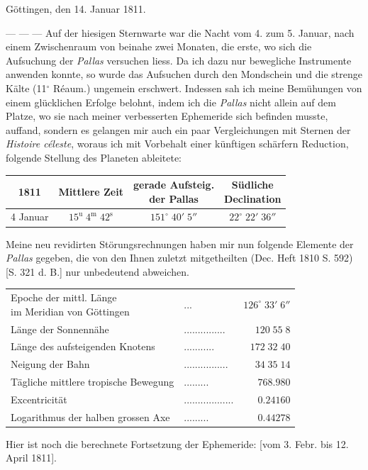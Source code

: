 \begin{flushright}Göttingen, den 14. Januar 1811.\end{flushright}
\par\indent --- --- --- Auf der hiesigen Sternwarte war die Nacht vom 4. zum 5. Januar, nach einem Zwischenraum von beinahe zwei Monaten, die erste, wo sich die Aufsuchung der \emph{Pallas} versuchen liess. Da ich dazu nur bewegliche Instrumente anwenden konnte, so wurde das Aufsuchen durch den Mondschein und die strenge Kälte (11$^\circ$ Réaum.) ungemein erschwert. Indessen sah ich meine Bemühungen von einem glücklichen Erfolge belohnt, indem ich die \emph{Pallas} nicht allein auf dem Platze, wo sie nach meiner verbesserten Ephemeride sich befinden musste, auffand, sondern es gelangen mir auch ein paar Vergleichungen mit Sternen der \emph{Histoire céleste}, woraus ich mit Vorbehalt einer künftigen schärfern Reduction, folgende Stellung des Planeten ableitete:

\begin{center}\fontsize{10}{12}\selectfont\setlength{\tabcolsep}{4pt}\renewcommand{\arraystretch}{1.15}\begin{tabular}{c|c|c|c}
1811 & Mittlere Zeit & \shortstack{gerade Aufsteig.\\der Pallas} & \shortstack{Südliche\\Declination}\\\hline
4 Januar & $15^{\text{u}}\;4^{\text{m}}\;42^{\text{s}}$ & $151^\circ\;40'\;5''$ & $22^\circ\;22'\;36''$\\
\end{tabular}\end{center}

\par\indent Meine neu revidirten Störungsrechnungen haben mir nun folgende Elemente der \emph{Pallas} gegeben, die von den Ihnen zuletzt mitgetheilten (Dec. Heft 1810 S. 592) [S. 321 d. B.] nur unbedeutend abweichen.

\begin{center}\fontsize{10}{12}\selectfont\setlength{\tabcolsep}{4pt}\renewcommand{\arraystretch}{1.15}\begin{tabular}{llr}
\shortstack[l]{Epoche der mittl. Länge\\im Meridian von Göttingen} & .\;.\;. & $126^\circ\;33'\;6''$\\
Länge der Sonnennähe & .\;.\;.\;.\;.\;.\;.\;.\;.\;.\;.\;.\;.\;.\;. & $120\;55\;8$\\
Länge des aufsteigenden Knotens & .\;.\;.\;.\;.\;.\;.\;.\;.\;.\;. & $172\;32\;40$\\
Neigung der Bahn & .\;.\;.\;.\;.\;.\;.\;.\;.\;.\;.\;.\;.\;.\;.\;. & $34\;35\;14$\\
Tägliche mittlere tropische Bewegung & .\;.\;.\;.\;.\;.\;.\;.\;. & $768.980$\\
Excentricität & .\;.\;.\;.\;.\;.\;.\;.\;.\;.\;.\;.\;.\;.\;.\;.\;.\;. & $0.24160$\\
Logarithmus der halben grossen Axe & .\;.\;.\;.\;.\;.\;.\;.\;. & $0.44278$\\
\end{tabular}\end{center}

\par\indent Hier ist noch die berechnete Fortsetzung der Ephemeride: [vom 3. Febr. bis 12. April 1811].
